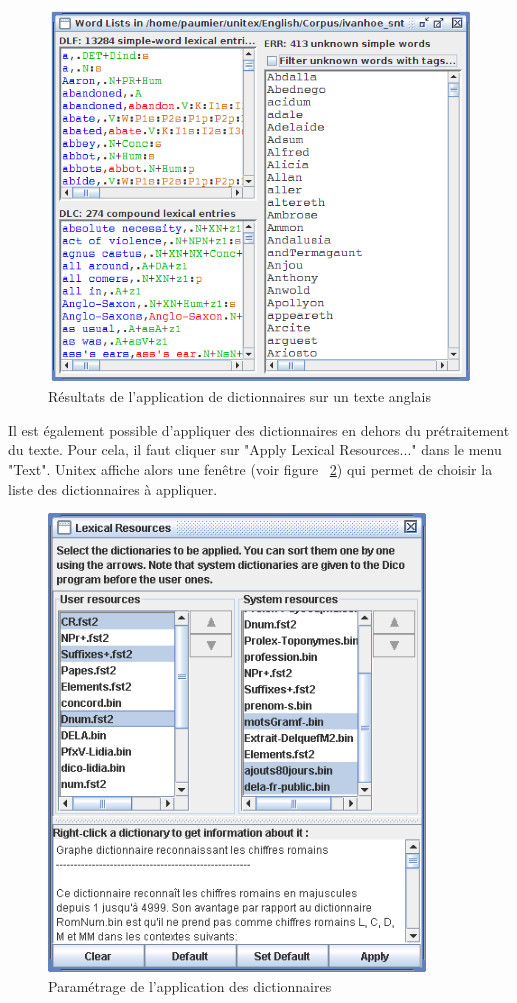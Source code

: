 \begin{figure}[!ht]
\begin{center}
\includegraphics[width=12cm]{resources/img/fig2-13.png}
\caption{Résultats de l’application de dictionnaires sur un texte
anglais\label{fig-Dico-application-results}}
\end{center}
\end{figure}

\bigskip
\noindent Il est également possible d’appliquer des dictionnaires en dehors du prétraitement du
texte. Pour cela, il faut cliquer sur "Apply Lexical Resources..." dans le menu "Text". Unitex
affiche alors une fenêtre (voir figure ~\ref{fig-Dico-configuration}) qui permet de choisir la
liste des dictionnaires à appliquer.


\begin{figure}[!ht]
\begin{center}
\includegraphics[width=10cm]{resources/img/fig2-14.png}
\caption{Paramétrage de l’application des dictionnaires\label{fig-Dico-configuration}}
\end{center}
\end{figure}

